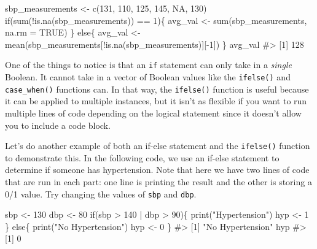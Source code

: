 \documentclass[
  letterpaper,
]{latex/krantz}
\makeatletter
\newenvironment{Shaded}{\begin{snugshade}}{\end{snugshade}}
\newcommand{\AttributeTok}[1]{\textcolor[rgb]{0.40,0.45,0.13}{#1}}
\newcommand{\CommentTok}[1]{\textcolor[rgb]{0.37,0.37,0.37}{#1}}
\newcommand{\ConstantTok}[1]{\textcolor[rgb]{0.56,0.35,0.01}{#1}}
\newcommand{\ControlFlowTok}[1]{\textcolor[rgb]{0.00,0.23,0.31}{#1}}
\newcommand{\DecValTok}[1]{\textcolor[rgb]{0.68,0.00,0.00}{#1}}
\newcommand{\FunctionTok}[1]{\textcolor[rgb]{0.28,0.35,0.67}{#1}}
\newcommand{\NormalTok}[1]{\textcolor[rgb]{0.00,0.23,0.31}{#1}}
\newcommand{\OtherTok}[1]{\textcolor[rgb]{0.00,0.23,0.31}{#1}}
\newcommand{\SpecialCharTok}[1]{\textcolor[rgb]{0.37,0.37,0.37}{#1}}
\newcommand{\StringTok}[1]{\textcolor[rgb]{0.13,0.47,0.30}{#1}}
\newenvironment{kframe}{%
\medskip{}
\setlength{\fboxsep}{.8em}
 \def\at@end@of@kframe{}%
 \ifinner\ifhmode%
  \def\at@end@of@kframe{\end{minipage}}%
  \begin{minipage}{\columnwidth}%
 \fi\fi%
 \def\FrameCommand##1{\hskip\@totalleftmargin \hskip-\fboxsep
 \colorbox{shadecolor}{##1}\hskip-\fboxsep
     \hskip-\linewidth \hskip-\@totalleftmargin \hskip\columnwidth}%
 \MakeFramed {\advance\hsize-\width
   \@totalleftmargin\z@ \linewidth\hsize
   \@setminipage}}%
 {\par\unskip\endMakeFramed%
 \at@end@of@kframe}
\renewenvironment{Shaded}{\begin{kframe}}{\end{kframe}}
\makeatother
\begin{document}
\begin{Shaded}
\begin{Highlighting}[]
\NormalTok{sbp\_measurements }\OtherTok{\textless{}{-}} \FunctionTok{c}\NormalTok{(}\DecValTok{131}\NormalTok{, }\DecValTok{110}\NormalTok{, }\DecValTok{125}\NormalTok{, }\DecValTok{145}\NormalTok{, }\ConstantTok{NA}\NormalTok{, }\DecValTok{130}\NormalTok{)}
\ControlFlowTok{if}\NormalTok{(}\FunctionTok{sum}\NormalTok{(}\SpecialCharTok{!}\FunctionTok{is.na}\NormalTok{(sbp\_measurements)) }\SpecialCharTok{==} \DecValTok{1}\NormalTok{)\{}
\NormalTok{  avg\_val }\OtherTok{\textless{}{-}} \FunctionTok{sum}\NormalTok{(sbp\_measurements, }\AttributeTok{na.rm =} \ConstantTok{TRUE}\NormalTok{)}
\NormalTok{\} }\ControlFlowTok{else}\NormalTok{\{}
\NormalTok{  avg\_val }\OtherTok{\textless{}{-}} \FunctionTok{mean}\NormalTok{(sbp\_measurements[}\SpecialCharTok{!}\FunctionTok{is.na}\NormalTok{(sbp\_measurements)][}\SpecialCharTok{{-}}\DecValTok{1}\NormalTok{])}
\NormalTok{\}}
\NormalTok{avg\_val}
\CommentTok{\#\textgreater{} [1] 128}
\end{Highlighting}
\end{Shaded}

One of the things to notice is that an \texttt{if} statement can only
take in a \emph{single} Boolean. It cannot take in a vector of Boolean
values like the \texttt{ifelse()} and \texttt{case\_when()} functions
can. In that way, the \texttt{ifelse()} function is useful because it
can be applied to multiple instances, but it isn't as flexible if you
want to run multiple lines of code depending on the logical statement
since it doesn't allow you to include a code block.

Let's do another example of both an if-else statement and the
\texttt{ifelse()} function to demonstrate this. In the following code,
we use an if-else statement to determine if someone has hypertension.
Note that here we have two lines of code that are run in each part: one
line is printing the result and the other is storing a 0/1 value. Try
changing the values of \texttt{sbp} and \texttt{dbp}.

\begin{Shaded}
\begin{Highlighting}[]
\NormalTok{sbp }\OtherTok{\textless{}{-}} \DecValTok{130}
\NormalTok{dbp }\OtherTok{\textless{}{-}} \DecValTok{80}
\ControlFlowTok{if}\NormalTok{(sbp }\SpecialCharTok{\textgreater{}} \DecValTok{140} \SpecialCharTok{|}\NormalTok{ dbp }\SpecialCharTok{\textgreater{}} \DecValTok{90}\NormalTok{)\{}
  \FunctionTok{print}\NormalTok{(}\StringTok{"Hypertension"}\NormalTok{)}
\NormalTok{  hyp }\OtherTok{\textless{}{-}} \DecValTok{1}
\NormalTok{\} }\ControlFlowTok{else}\NormalTok{\{}
  \FunctionTok{print}\NormalTok{(}\StringTok{"No Hypertension"}\NormalTok{)}
\NormalTok{  hyp }\OtherTok{\textless{}{-}} \DecValTok{0}
\NormalTok{\}}
\CommentTok{\#\textgreater{} [1] "No Hypertension"}
\NormalTok{hyp}
\CommentTok{\#\textgreater{} [1] 0}
\end{Highlighting}
\end{Shaded}
\end{document}

